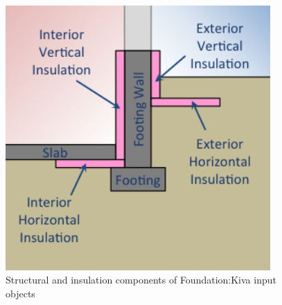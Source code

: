 \begin{figure}[hbtp] 
\centering
\includegraphics[width=0.9\textwidth, height=0.9\textheight, keepaspectratio=true]{media/kiva-2d-elements.png}
\caption{Structural and insulation components of Foundation:Kiva input objects}
\end{figure}

